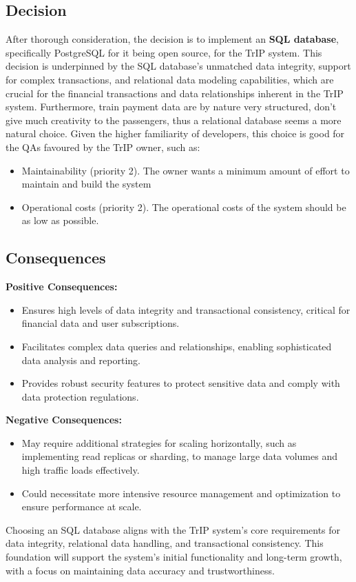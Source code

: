 \subsection*{Decision}
After thorough consideration, the decision is to implement an \textbf{SQL database}, specifically PostgreSQL for it being open source, for the TrIP system. This decision is underpinned by the SQL database's unmatched data integrity, support for complex transactions, and relational data modeling capabilities, which are crucial for the financial transactions and data relationships inherent in the TrIP system. Furthermore, train payment data are by nature very structured, don't give much creativity to the passengers, thus a relational database seems a more natural choice. Given the higher familiarity of developers, this choice is good for the QAs favoured by the TrIP owner, such as:
\begin{itemize}
    \item Maintainability (priority 2). The owner wants a minimum amount of effort to maintain and build the system
    \item Operational costs (priority 2). The operational costs of the system should be as low as possible.
\end{itemize}

\subsection*{Consequences}
\textbf{Positive Consequences:}
\begin{itemize}
    \item Ensures high levels of data integrity and transactional consistency, critical for financial data and user subscriptions.
    \item Facilitates complex data queries and relationships, enabling sophisticated data analysis and reporting.
    \item Provides robust security features to protect sensitive data and comply with data protection regulations.
\end{itemize}
\textbf{Negative Consequences:}
\begin{itemize}
    \item May require additional strategies for scaling horizontally, such as implementing read replicas or sharding, to manage large data volumes and high traffic loads effectively.
    \item Could necessitate more intensive resource management and optimization to ensure performance at scale.
\end{itemize}
Choosing an SQL database aligns with the TrIP system's core requirements for data integrity, relational data handling, and transactional consistency. This foundation will support the system's initial functionality and long-term growth, with a focus on maintaining data accuracy and trustworthiness.